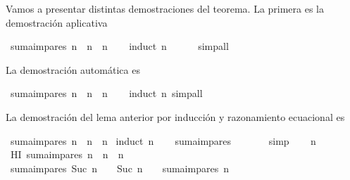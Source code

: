 \begin{isabellebody}
\begin{isamarkuptext}
  Vamos a presentar distintas demostraciones del teorema. La 
  primera es la demostración aplicativa%
\end{isamarkuptext}\isamarkuptrue%
\isamarkupfalse%
\ {\isachardoublequoteopen}suma{\isacharunderscore}impares\ n\ {\isacharequal}\ n\ {\isacharasterisk}\ n{\isachardoublequoteclose}\isanewline
%
\isadelimproof
\ \ %
\endisadelimproof
%
\isatagproof
{}\isamarkupfalse%
\ {\isacharparenleft}induct\ n{\isacharparenright}\ \isanewline
\ \ \ \isamarkupfalse%
\ simp{\isacharunderscore}all\isanewline
\ \ \isamarkupfalse%
%
\endisatagproof
{\isafoldproof}%
%
\isadelimproof
%
\endisadelimproof
%
\begin{isamarkuptext}%
La demostración automática es%
\end{isamarkuptext}\isamarkuptrue%
\isamarkupfalse%
\ {\isachardoublequoteopen}suma{\isacharunderscore}impares\ n\ {\isacharequal}\ n\ {\isacharasterisk}\ n{\isachardoublequoteclose}\isanewline
%
\isadelimproof
\ \ %
\endisadelimproof
%
\isatagproof
{}\isamarkupfalse%
\ {\isacharparenleft}induct\ n{\isacharparenright}\ simp{\isacharunderscore}all%
\endisatagproof
{\isafoldproof}%
%
\isadelimproof
%
\endisadelimproof
%
\begin{isamarkuptext}%
La demostración del lema anterior por inducción y razonamiento 
   ecuacional es%
\end{isamarkuptext}\isamarkuptrue%
\isamarkupfalse%
\ {\isachardoublequoteopen}suma{\isacharunderscore}impares\ n\ {\isacharequal}\ n\ {\isacharasterisk}\ n{\isachardoublequoteclose}\isanewline
%
\isadelimproof
%
\endisadelimproof
%
\isatagproof
{}\isamarkupfalse%
\ {\isacharparenleft}induct\ n{\isacharparenright}\isanewline
\ \ \isamarkupfalse%
\ {\isachardoublequoteopen}suma{\isacharunderscore}impares\ {}\ {\isacharequal}\ {}\ {\isacharasterisk}\ {}{\isachardoublequoteclose}\ \isamarkupfalse%
\ simp\isanewline
{}\isamarkupfalse%
\isanewline
\ \ \isamarkupfalse%
\ n\ \isamarkupfalse%
\ HI{\isacharcolon}\ {\isachardoublequoteopen}suma{\isacharunderscore}impares\ n\ {\isacharequal}\ n\ {\isacharasterisk}\ n{\isachardoublequoteclose}\isanewline
\ \ \isamarkupfalse%
\ {\isachardoublequoteopen}suma{\isacharunderscore}impares\ {\isacharparenleft}Suc\ n{\isacharparenright}\ {\isacharequal}\ {\isacharparenleft}{}\ {\isacharasterisk}\ {\isacharparenleft}Suc\ n{\isacharparenright}\ {\isacharminus}\ {}{\isacharparenright}\ {\isacharplus}\ suma{\isacharunderscore}impares\ n{\isachardoublequoteclose}\ \isanewline

\end{isabellebody}

